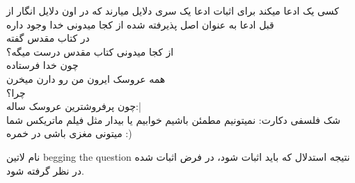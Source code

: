 \documentclass{article}
\begin{document}
	 کسی یک ادعا میکند برای اثبات ادعا یک سری دلایل میارند که در اون دلایل
	انگار از قبل ادعا به عنوان اصل پذیرفته شده 
	از کجا میدونی خدا وجود داره\\
	در کتاب مقدس گفته\\
	از کجا میدونی کتاب مقدس درست میگه؟\\
	چون خدا فرستاده\\
	همه عروسک ایرون من رو دارن میخرن\\
	چرا؟\\
	چون پرفروشترین عروسک ساله:|\\
	شک فلسفی دکارت: نمیتونیم مطمئن باشیم خوابیم یا بیدار مثل فیلم ماتریکس شما میتونی مغزی باشی در خمره :)\ 
	
	نام لاتین  begging the question
	نتیجه استدلال که باید اثبات شود،‌ در فرض اثبات شده در نظر گرفته شود.\\
	
	
\end{document}
